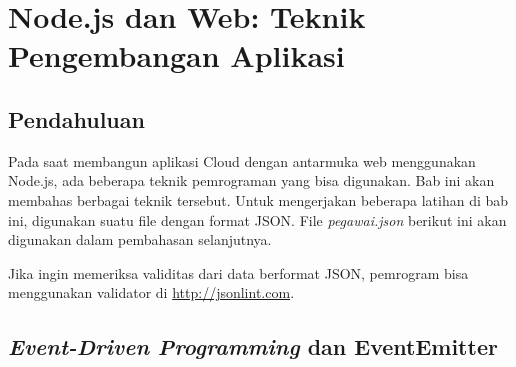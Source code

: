 \chapter{Node.js dan Web: Teknik Pengembangan Aplikasi}

\section{Pendahuluan}

Pada saat membangun aplikasi Cloud dengan antarmuka web menggunakan Node.js, ada beberapa teknik pemrograman yang bisa digunakan. Bab ini akan membahas berbagai teknik tersebut. Untuk mengerjakan beberapa latihan di bab ini, digunakan suatu file dengan format JSON. File \textit{pegawai.json} berikut ini akan digunakan dalam pembahasan selanjutnya.

\lstset{language=JavaScript,caption=pegawai.json}


Jika ingin memeriksa validitas dari data berformat JSON, pemrogram bisa menggunakan validator di \url{http://jsonlint.com}.

\section{\textit{Event-Driven Programming} dan EventEmitter}

